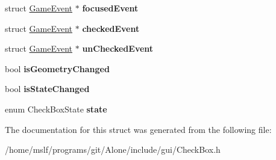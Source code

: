 \begin{DoxyCompactItemize}
\item 
\hypertarget{struct_check_box_af8909553495b609dc7c9efd469ffc31d}{}\label{struct_check_box_af8909553495b609dc7c9efd469ffc31d} 
struct \hyperlink{struct_game_event}{Game\+Event} $\ast$ {\bfseries focused\+Event}
\item 
\hypertarget{struct_check_box_addbf2597e636bf2937b48b86c2fc02a4}{}\label{struct_check_box_addbf2597e636bf2937b48b86c2fc02a4} 
struct \hyperlink{struct_game_event}{Game\+Event} $\ast$ {\bfseries checked\+Event}
\item 
\hypertarget{struct_check_box_aee6e54d35d8850022093412d674007da}{}\label{struct_check_box_aee6e54d35d8850022093412d674007da} 
struct \hyperlink{struct_game_event}{Game\+Event} $\ast$ {\bfseries un\+Checked\+Event}
\item 
\hypertarget{struct_check_box_a8ea7e8ac3e3330830aa7a4309390f3ac}{}\label{struct_check_box_a8ea7e8ac3e3330830aa7a4309390f3ac} 
bool {\bfseries is\+Geometry\+Changed}
\item 
\hypertarget{struct_check_box_abbe46dfeadc7ca8af4ccd6a1e60fa560}{}\label{struct_check_box_abbe46dfeadc7ca8af4ccd6a1e60fa560} 
bool {\bfseries is\+State\+Changed}
\item 
\hypertarget{struct_check_box_a4838c2cc38726ce534b297b6df5ec9fe}{}\label{struct_check_box_a4838c2cc38726ce534b297b6df5ec9fe} 
enum Check\+Box\+State {\bfseries state}
\end{DoxyCompactItemize}


The documentation for this struct was generated from the following file\+:\begin{DoxyCompactItemize}
\item 
/home/mslf/programs/git/\+Alone/include/gui/Check\+Box.\+h\end{DoxyCompactItemize}
